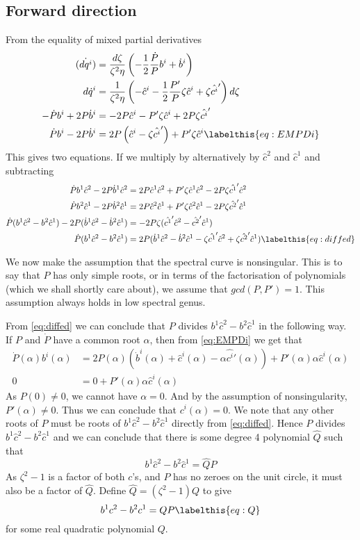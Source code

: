 \subsection{Forward direction}
From the equality of mixed partial derivatives
\begin{align*}
\dot{(dq^i)} &= \frac{d\zeta}{\zeta^2\eta}\left( -\frac{1}{2}\frac{\dot P}{P}b^i + \dot b^i \right) \\
d\dot q^i & = \frac{1}{\zeta^2\eta}\left( -\hat c^i -\frac{1}{2}\frac{P'}{P}\zeta\hat c^i + \zeta\hat {c^i}'\right)d\zeta \\
-\dot P b^i + 2P \dot b^i & = -2P \hat c^i -P'\zeta\hat c^i + 2P\zeta\hat {c^i}' \\
\dot P b^i - 2P\dot b^i &= 2P\left( \hat c^i - \zeta\hat {c^i}'\right) + P'\zeta\hat c^i \labelthis{eq:EMPDi}
\end{align*}
This gives two equations. If we multiply by alternatively by $\hat c^2$ and $\hat c^1$ and subtracting
\begin{align*}
\dot P b^1\hat c^2 - 2P \dot b^1\hat c^2 & = 2P \hat c^1\hat c^2 +P'\zeta\hat c^1\hat c^2 - 2P\zeta\hat {c^1}'\hat c^2 \\
\dot P b^2\hat c^1 - 2P \dot b^2\hat c^1 & = 2P \hat c^2\hat c^1 +P'\zeta\hat c^2\hat c^1 - 2P\zeta\hat {c^2}'\hat c^1 \\
\dot P (b^1\hat c^2 - b^2\hat c^1) - 2P (\dot b^1\hat c^2 - \dot b^2\hat c^1) & = - 2P\zeta(\hat {c^1}'\hat c^2 - \hat {c^2}'\hat c^1) \\
\dot P (b^1\hat c^2 - b^2\hat c^1) & =  2P(\dot b^1\hat c^2 - \dot b^2\hat c^1 - \zeta\hat {c^1}'\hat c^2 + \zeta\hat {c^2}'\hat c^1)\labelthis{eq:diffed}
\end{align*}

We now make the assumption that the spectral curve is nonsingular. This is to say that $P$ has only simple roots, or in terms of the factorisation of polynomials (which we shall shortly care about), we assume that $gcd(P,P') = 1$. This assumption always holds in low spectral genus.

From \eqref{eq:diffed} we can conclude that $P$ divides $b^1\hat c^2 - b^2\hat c^1$ in the following way. If $P$ and $\dot P$ have a common root $\alpha$, then from \eqref{eq:EMPDi} we get that
\begin{align*}
\dot P(\alpha) b^i(\alpha) &= 2P(\alpha)\left( \dot b^i(\alpha) + \hat c^i(\alpha) - \alpha\hat {c^i}'(\alpha)\right) +P'(\alpha)\alpha\hat c^i(\alpha) \\
0 &= 0 + P'(\alpha)\alpha\hat c^i(\alpha)
\end{align*}
As $P(0)\neq 0$, we cannot have $\alpha=0$. And by the assumption of nonsingularity, $P'(\alpha)\neq 0$. Thus we can conclude that $c^i(\alpha)=0$. We note that any other roots of $P$ must be roots of $b^1\hat c^2 - b^2 \hat c^1$ directly from \eqref{eq:diffed}. Hence $P$ divides $b^1\hat c^2 - b^2 \hat c^1$ and we can conclude that there is some degree 4 polynomial $\hat Q$ such that
\[
b^1 \hat c^2 - b^2 \hat c^1 = \hat Q P
\]
As $\zeta^2-1$ is a factor of both $c$'s, and $P$ has no zeroes on the unit circle, it must also be a factor of $\hat Q$. Define $\hat Q = (\zeta^2-1)Q$ to give
\[
b^1 c^2 - b^2 c^1 = Q P \labelthis{eq:Q}
\]
for some real quadratic polynomial $Q$.

